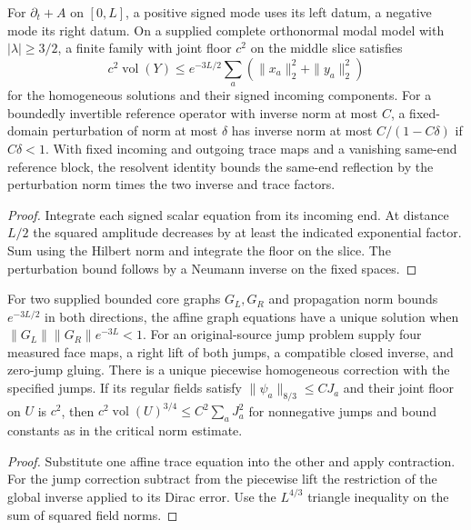 \begin{proposition}
\label{prop:spin-mode-transmission}
\leanok
For $\partial_t+A$ on $[0,L]$, a positive signed mode uses its left
datum, a negative mode its right datum. On a supplied complete
orthonormal modal model with $|\lambda|\ge3/2$, a finite family with
joint floor $c^2$ on the middle slice satisfies
\[
 c^2\operatorname{vol}(Y)
 \le e^{-3L/2}\sum_a(\|x_a\|_2^2+\|y_a\|_2^2)
\]
for the homogeneous solutions and their signed incoming components.
For a boundedly invertible reference operator with inverse norm at most
$C$, a fixed-domain perturbation of norm at most $\delta$ has inverse
norm at most $C/(1-C\delta)$ if $C\delta<1$.
With fixed incoming and outgoing trace maps and a vanishing same-end
reference block, the resolvent identity bounds the same-end reflection
by the perturbation norm times the two inverse and trace factors.
\end{proposition}
\begin{proof}
\leanok
Integrate each signed scalar equation from its incoming end. At distance
$L/2$ the squared amplitude decreases by at least the indicated exponential
factor. Sum using the Hilbert norm and integrate the floor on the slice.
The perturbation bound follows by a Neumann inverse on the fixed spaces.
\end{proof}

\begin{proposition}
\label{prop:spin-core-and-jump}
\leanok
For two supplied bounded core graphs $G_L,G_R$ and propagation norm
bounds $e^{-3L/2}$ in both directions, the affine graph equations have
a unique solution when $\|G_L\|\|G_R\|e^{-3L}<1$. For an original-source
jump problem supply four measured face maps, a right lift of both jumps,
a compatible closed inverse, and zero-jump gluing. There is a unique
piecewise homogeneous correction with the specified jumps. If its regular
fields satisfy $\|\psi_a\|_{8/3}\le C J_a$ and their joint floor on $U$ is
$c^2$, then $c^2\operatorname{vol}(U)^{3/4}\le C^2\sum_a J_a^2$ for
nonnegative jumps and bound constants as in the critical norm estimate.
\end{proposition}
\begin{proof}
\leanok
Substitute one affine trace equation into the other and apply contraction.
For the jump correction subtract from the piecewise lift the restriction
of the global inverse applied to its Dirac error. Use the $L^{4/3}$
triangle inequality on the sum of squared field norms.
\end{proof}

